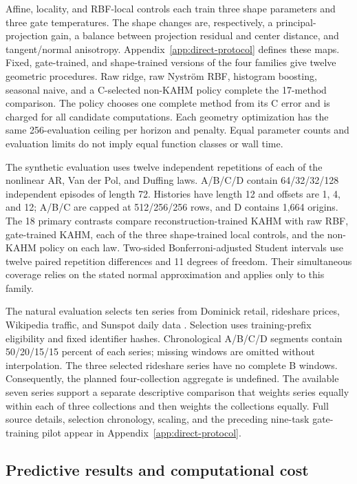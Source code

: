 Affine, locality, and RBF-local controls each train three shape parameters
and three gate temperatures. The shape changes are, respectively, a
principal-projection gain, a balance between projection residual and
center distance, and tangent/normal anisotropy. Appendix~\ref{app:direct-protocol}
defines these maps. Fixed, gate-trained, and shape-trained versions of
the four families give twelve geometric procedures. Raw ridge, raw
Nystr\"om RBF, histogram boosting, seasonal naive, and a C-selected
non-KAHM policy complete the 17-method comparison. The policy chooses
one complete method from its C error and is charged for all candidate
computations. Each geometry optimization has the same 256-evaluation
ceiling per horizon and penalty. Equal parameter counts and evaluation
limits do not imply equal function classes or wall time.

The synthetic evaluation uses twelve independent repetitions of each of
the nonlinear AR, Van der Pol, and Duffing laws. A/B/C/D contain
64/32/32/128 independent episodes of length 72. Histories have length 12
and offsets are 1, 4, and 12; A/B/C are capped at 512/256/256 rows,
and D contains 1,664 origins. The 18 primary contrasts compare
reconstruction-trained KAHM with raw RBF, gate-trained KAHM, each of the
three shape-trained local controls, and the non-KAHM policy on each law.
Two-sided Bonferroni-adjusted Student intervals use twelve paired
repetition differences and 11 degrees of freedom. Their simultaneous
coverage relies on the stated normal approximation and applies only to
this family.

The natural evaluation selects ten series from Dominick retail,
rideshare prices, Wikipedia traffic, and Sunspot daily data
\citep{Godahewa2021Monash}. Selection uses training-prefix eligibility
and fixed identifier hashes. Chronological A/B/C/D segments contain
50/20/15/15 percent of each series; missing windows are omitted without
interpolation. The three selected rideshare series have no complete B
windows. Consequently, the planned four-collection aggregate is
undefined. The available seven series support a separate descriptive
comparison that weights series equally within each of three collections
and then weights the collections equally. Full source details, selection
chronology, scaling, and the preceding nine-task gate-training pilot
appear in Appendix~\ref{app:direct-protocol}.

\subsection{Predictive results and computational cost}

